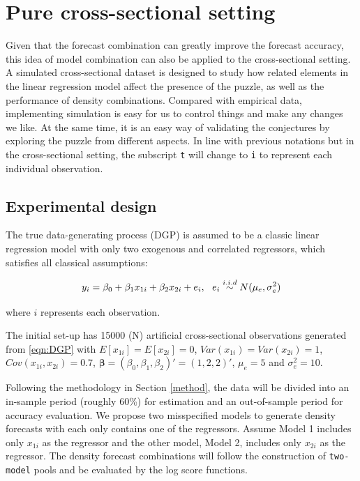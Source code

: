 \documentclass{monashthesis}
\begin{document}
\hypertarget{pure-cross-sectional-setting}{%
\section{Pure cross-sectional setting}\label{pure-cross-sectional-setting}}

Given that the forecast combination can greatly improve the forecast accuracy, this idea of model combination can also be applied to the cross-sectional setting. A simulated cross-sectional dataset is designed to study how related elements in the linear regression model affect the presence of the puzzle, as well as the performance of density combinations. Compared with empirical data, implementing simulation is easy for us to control things and make any changes we like. At the same time, it is an easy way of validating the conjectures by exploring the puzzle from different aspects. In line with previous notations but in the cross-sectional setting, the subscript \texttt{t} will change to \texttt{i} to represent each individual observation.

\hypertarget{experimental-design}{%
\subsection{Experimental design}\label{experimental-design}}

The true data-generating process (DGP) is assumed to be a classic linear regression model with only two exogenous and correlated regressors, which satisfies all classical assumptions:

\begin{equation}
\label{eqn:DGP}
y_i = \beta_0 + \beta_1 x_{1i} + \beta_2 x_{2i} + e_i, \ \ e_i \stackrel{i.i.d}{\sim} N(\mu_e,\sigma^2_e) \\
\end{equation}

where \(i\) represents each observation.

The initial set-up has 15000 (N) artificial cross-sectional observations generated from \ref{eqn:DGP} with \(E[x_{1i}] = E[x_{2i}] = 0\), \(Var(x_{1i}) = Var(x_{2i}) = 1\), \(Cov(x_{1i}, x_{2i}) = 0.7\), \(\pmb{\beta} = (\beta_0, \beta_1, \beta_2)' = (1,2,2)'\), \(\mu_e = 5\) and \(\sigma^2_e=10\).

Following the methodology in Section \ref{method}, the data will be divided into an in-sample period (roughly 60\%) for estimation and an out-of-sample period for accuracy evaluation. We propose two misspecified models to generate density forecasts with each only contains one of the regressors. Assume Model 1 includes only \(x_{1i}\) as the regressor and the other model, Model 2, includes only \(x_{2i}\) as the regressor. The density forecast combinations will follow the construction of \texttt{two-model} pools and be evaluated by the log score functions.
\end{document}
